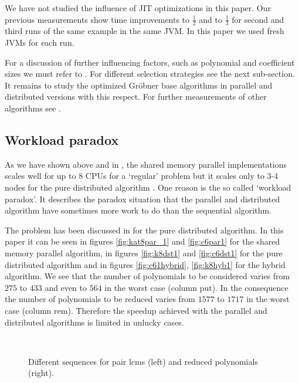 \documentclass[10pt,twocolumn,a4paper]{article}
\begin{document}
We have not studied the influence of JIT optimizations in this paper.
Our previous measurements \cite{Kredel:2008a,Kredel:2008b,Kredel:2009a} 
show time improvements to $\frac{1}{2}$ and to $\frac{1}{3}$ for
second and third runs of the same example in the same JVM. In this
paper we used fresh JVMs for each run.


For a discussion of further influencing factors, such as polynomial
and coefficient sizes we must refer to \cite{Kredel:2009}.  For
different selection strategies see the next sub-section.  It remains
to study the optimized Gr\"obner base algorithms
\cite{GebauerMoeller:1988,GioviniMora:1991,Faugere:1999,Faugere:2002} in parallel and
distributed versions with this respect.  
 For further measurements of other algorithms see
 \cite{Kredel:2008a,Kredel:2009,Kredel:2010a}.


\subsection{Workload paradox} \label{sec:workpara}

As we have shown above and in \cite{Kredel:2006}, the shared memory
parallel implementations scales well for up to 8 CPUs for a `regular'
problem but it scales only to 3-4 nodes for the pure distributed
algorithm \cite{Kredel:2009}.  One reason is the so called `workload
paradox'. It describes the paradox situation that the parallel and
distributed algorithm have sometimes more work to do than the
sequential algorithm.

The problem has been discussed in \cite{Kredel:2009} for the pure
distributed algorithm.  In this paper it can be seen in figures
\ref{fig:kat8par_1} and \ref{fig:c6par1} for the shared memory parallel
algorithm, in figures \ref{fig:k8dst1} and \ref{fig:c6dst1} for the
pure distributed algorithm and in figures \ref{fig:c61hybrid},
\ref{fig:k8hyb1} for the hybrid algorithm.  We see that the number of
polynomials to be considered varies from $275$ to $433$ and even to
$564$ in the worst case (column put). In the consequence the number of
polynomials to be reduced varies from $1577$ to $1717$ in the worst
case (column rem). Therefore the speedup achieved with the parallel
and distributed algorithms is limited in unlucky cases.

\begin{figure}[thb]
\centering
{}
\mbox{\  }
\caption{Different sequences for pair lcms (left) and reduced polynomials (right).}
\label{fig:lcmpairsdiff}
\label{fig:hpolpairsdiff}
\end{figure}
\end{document}
